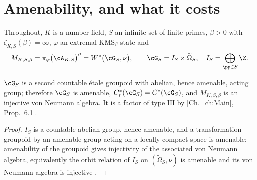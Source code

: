\section{Amenability, and what it costs}

Throughout, $K$ is a number field, $S$ an infinite set of finite primes, $\beta>0$ with
$\zeta_{K,S}(\beta)=\infty$, $\varphi$ an extremal $\mathrm{KMS}_\beta$ state and
\[
M_{K,S,\beta}=\pi_\varphi\bigl(\cA_{K,S}\bigr)''=W^*\bigl(\cG_S,\nu\bigr),
\qquad \cG_S=I_S\ltimes\widetilde\Omega_S,\quad I_S=\bigoplus_{\pp\in S}\Z .
\]

\begin{lemma}[Amenability]\label{IX:lem:amenable}
$\cG_S$ is a second countable étale groupoid with abelian, hence amenable, acting group;
therefore $\cG_S$ is amenable, $C^*_r(\cG_S)=C^*(\cG_S)$, and $M_{K,S,\beta}$ is an injective
von Neumann algebra. It is a factor of type $\mathrm{III}$ by [Ch.~\ref{ch:Main}, Prop.~6.1].
\end{lemma}

\begin{proof}
$I_S$ is a countable abelian group, hence amenable, and a transformation groupoid by an
amenable group acting on a locally compact space is amenable; amenability of the groupoid
gives injectivity of the associated von Neumann algebra, equivalently the orbit relation
of $I_S$ on $(\widetilde\Omega_S,\nu)$ is amenable and its von Neumann algebra
\cite{FM} is injective \cite{CFW}.
\end{proof}

